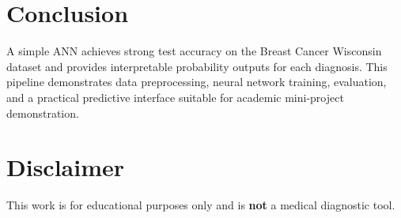 \documentclass[12pt,a4paper]{article}
\begin{document}
\section{Conclusion}
A simple ANN achieves strong test accuracy on the Breast Cancer Wisconsin
dataset and provides interpretable probability outputs for each diagnosis.
This pipeline demonstrates data preprocessing, neural network training,
evaluation, and a practical predictive interface suitable for academic
mini-project demonstration.

\section*{Disclaimer}
This work is for educational purposes only and is \textbf{not} a medical
diagnostic tool.



\end{document}
